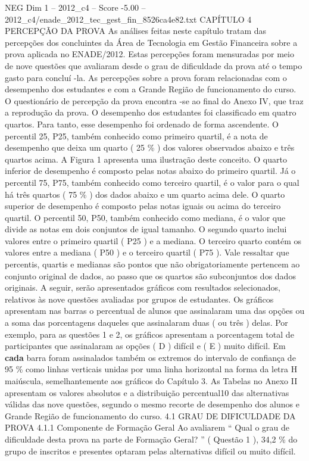 \begin{textsample}{NEG Dim 1 – 2012\_c4 – Score -5.00 – 2012\_c4/enade\_2012\_tec\_gest\_fin\_8526ca4e82.txt}  \label{ex:f1_neg_075}
CAPÍTULO 4 PERCEPÇÃO DA PROVA As análises feitas neste capítulo tratam das percepções dos concluintes da Área de Tecnologia em Gestão Financeira sobre a prova aplicada no ENADE/2012.
Estas percepções foram mensuradas por meio de nove questões que avaliaram desde o grau de dificuldade da prova até o tempo gasto para concluí -la.
As percepções sobre a prova foram relacionadas com o desempenho dos estudantes e com a Grande Região de funcionamento do curso.
O questionário de percepção da prova encontra -se ao final do Anexo IV, que traz a reprodução da prova.
O desempenho dos estudantes foi classificado em quatro quartos.
Para tanto, esse desempenho foi ordenado de forma ascendente.
O percentil 25, P25, também conhecido como primeiro quartil, é a nota de desempenho que deixa um quarto ( 25 \% ) dos valores observados abaixo e três quartos acima.
A Figura 1 apresenta uma ilustração deste conceito.
O quarto inferior de desempenho é composto pelas notas abaixo do primeiro quartil.
Já o percentil 75, P75, também conhecido como terceiro quartil, é o valor para o qual há três quartos ( 75 \% ) dos dados abaixo e um quarto acima dele.
O quarto superior de desempenho é composto pelas notas iguais ou acima do terceiro quartil.
O percentil 50, P50, também conhecido como mediana, é o valor que divide as notas em dois conjuntos de igual tamanho.
O segundo quarto inclui valores entre o primeiro quartil ( P25 ) e a mediana.
O terceiro quarto contém os valores entre a mediana ( P50 ) e o terceiro quartil ( P75 ).
Vale ressaltar que percentis, quartis e medianas são pontos que não obrigatoriamente pertencem ao conjunto original de dados, ao passo que os quartos são subconjuntos dos dados originais.
A seguir, serão apresentados gráficos com resultados selecionados, relativos às nove questões avaliadas por grupos de estudantes.
Os gráficos apresentam nas barras o percentual de alunos que assinalaram uma das opções ou a soma das porcentagens daqueles que assinalaram duas ( ou três ) delas.
Por exemplo, para as questões 1 e 2, os gráficos apresentam a porcentagem total de participantes que assinalaram as opções ( D ) difícil e ( E ) muito difícil.
Em \textbf{cada} barra foram assinalados também os extremos do intervalo de confiança de 95 \% como linhas verticais unidas por uma linha horizontal na forma da letra H maiúscula, semelhantemente aos gráficos do Capítulo 3.
As Tabelas no Anexo II apresentam os valores absolutos e a distribuição percentual10 das alternativas válidas das nove questões, segundo o mesmo recorte de desempenho dos alunos e Grande Região de funcionamento do curso. 4.1 GRAU DE DIFICULDADE DA PROVA 4.1.1 Componente de Formação Geral Ao avaliarem “ Qual o grau de dificuldade desta prova na parte de Formação Geral? ” ( Questão 1 ), 34,2 \% do grupo de inscritos e presentes optaram pelas alternativas difícil ou muito difícil.

\end{textsample}
